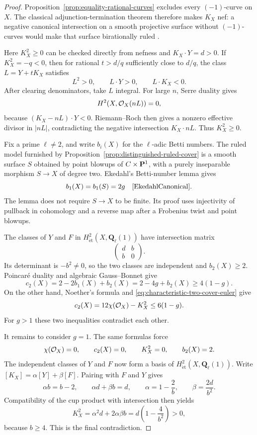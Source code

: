 \begin{proof}
Proposition~\ref{prop:equality-rational-curves} excludes every
$(-1)$-curve on $X$. The classical adjunction-termination theorem
therefore makes $K_X$ nef: a negative canonical intersection on a
smooth projective surface without $(-1)$-curves would make that
surface birationally ruled
\cite[\S1, Steps~I--VII, pp.~326--330]{MumfordEnriquesI}.

Here $K_X^2\geq0$ can be checked directly from nefness and
$K_X\cdot Y=d>0$. If $K_X^2=-q<0$, then for rational $t>d/q$
sufficiently close to $d/q$, the class $L=Y+tK_X$ satisfies
\[
 L^2>0,\qquad L\cdot Y>0,\qquad L\cdot K_X<0.
\]
After clearing denominators, take $L$ integral.
For large $n$, Serre duality gives
\[
 H^2(X,\mathcal O_X(nL))=0,
\]
because $(K_X-nL)\cdot Y<0$. Riemann--Roch then gives a nonzero
effective divisor in $|nL|$, contradicting the negative
intersection $K_X\cdot nL$. Thus $K_X^2\geq0$.

Fix a prime $\ell\ne2$, and write $b_i(X)$ for the
$\ell$-adic Betti numbers. The ruled model furnished by
Proposition~\ref{prop:distinguished-ruled-cover} is a smooth surface
$S$ obtained by point blowups of $C\times\mathbf P^1$, with a purely
inseparable morphism $S\to X$ of degree two. Ekedahl's
Betti-number lemma gives
\[
 b_1(X)=b_1(S)=2g
 \quad\text{\cite[Lemma~0.1.5, p.~103]{EkedahlCanonical}}.
\]
The lemma does not require $S\to X$ to be finite. Its proof uses
injectivity of pullback in cohomology and a reverse map after
a Frobenius twist and point blowups.

The classes of $Y$ and $F$ in
$H^2_{\mathrm{\acute et}}(X,\mathbf Q_\ell(1))$
have intersection matrix
\[
 \begin{pmatrix}d&b\\ b&0\end{pmatrix}.
\]
Its determinant is $-b^2\ne0$, so the two classes are independent
and $b_2(X)\geq2$. Poincar\'e duality and algebraic Gauss--Bonnet
\cite[Tag~0FH0]{Stacks} give
\[
 c_2(X)=2-2b_1(X)+b_2(X)
       =2-4g+b_2(X)\geq4(1-g).
\]
On the other hand, Noether's formula and
\eqref{eq:characteristic-two-cover-euler} give
\[
 c_2(X)=12\chi(\mathcal O_X)-K_X^2\leq6(1-g).
\]
For $g>1$ these two inequalities contradict each other.

It remains to consider $g=1$. The same formulas force
\[
 \chi(\mathcal O_X)=0,\qquad c_2(X)=0,\qquad
 K_X^2=0,\qquad b_2(X)=2.
\]
The independent classes of $Y$ and $F$ now form a basis of
$H^2_{\mathrm{\acute et}}(X,\mathbf Q_\ell(1))$.
Write $[K_X]=\alpha[Y]+\beta[F]$. Pairing with $F$ and $Y$
gives
\[
 \alpha b=b-2,\qquad \alpha d+\beta b=d,
 \qquad
 \alpha=1-\frac2b,\qquad \beta=\frac{2d}{b^2}.
\]
Compatibility of the cup product with intersection then yields
\begin{equation}\label{eq:characteristic-two-canonical-square}
 K_X^2=\alpha^2d+2\alpha\beta b
      =d\left(1-\frac4{b^2}\right)>0,
\end{equation}
because $b\geq4$. This is the final contradiction.


\end{proof}
